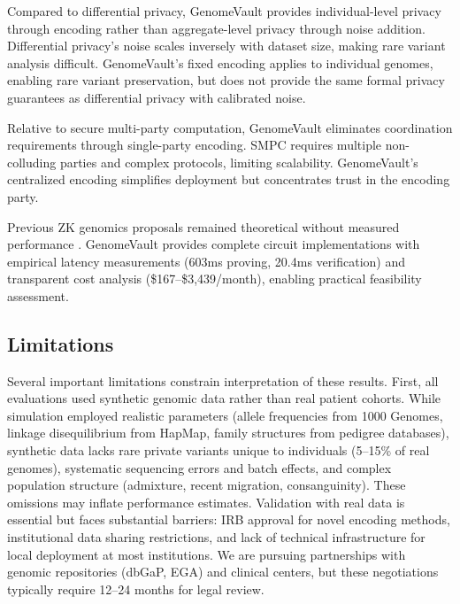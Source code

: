 \documentclass[11pt,letterpaper]{article}
\begin{document}
Compared to differential privacy, GenomeVault provides individual-level privacy through encoding rather than aggregate-level privacy through noise addition. Differential privacy's noise scales inversely with dataset size, making rare variant analysis difficult. GenomeVault's fixed encoding applies to individual genomes, enabling rare variant preservation, but does not provide the same formal privacy guarantees as differential privacy with calibrated noise.

Relative to secure multi-party computation, GenomeVault eliminates coordination requirements through single-party encoding. SMPC requires multiple non-colluding parties and complex protocols, limiting scalability. GenomeVault's centralized encoding simplifies deployment but concentrates trust in the encoding party.

Previous ZK genomics proposals remained theoretical without measured performance \cite{bogatyy2020,demmler2019}. GenomeVault provides complete circuit implementations with empirical latency measurements (603ms proving, 20.4ms verification) and transparent cost analysis (\$167--\$3,439/month), enabling practical feasibility assessment.

\subsection{Limitations}
\label{sec:limitations}

Several important limitations constrain interpretation of these results. First, all evaluations used synthetic genomic data rather than real patient cohorts. While simulation employed realistic parameters (allele frequencies from 1000 Genomes, linkage disequilibrium from HapMap, family structures from pedigree databases), synthetic data lacks rare private variants unique to individuals (5--15\% of real genomes), systematic sequencing errors and batch effects, and complex population structure (admixture, recent migration, consanguinity). These omissions may inflate performance estimates. Validation with real data is essential but faces substantial barriers: IRB approval for novel encoding methods, institutional data sharing restrictions, and lack of technical infrastructure for local deployment at most institutions. We are pursuing partnerships with genomic repositories (dbGaP, EGA) and clinical centers, but these negotiations typically require 12--24 months for legal review.
\end{document}
